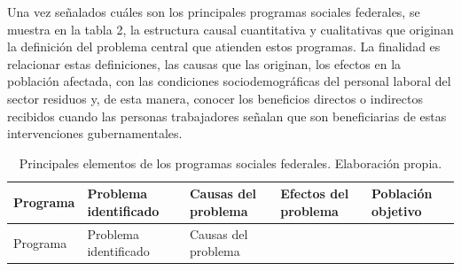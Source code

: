 \documentclass[
  spanish,
  11.5pt,
  170mm x 240mmpaper,
]{scrbook}
\begin{document}
Una vez señalados cuáles son los principales programas sociales
federales, se muestra en la tabla 2, la estructura causal cuantitativa y
cualitativas que originan la definición del problema central que
atienden estos programas. La finalidad es relacionar estas definiciones,
las causas que las originan, los efectos en la población afectada, con
las condiciones sociodemográficas del personal laboral del sector
residuos y, de esta manera, conocer los beneficios directos o indirectos
recibidos cuando las personas trabajadores señalan que son beneficiarias
de estas intervenciones gubernamentales.

\begingroup
\scriptsize

\begin{longtable}[]{@{}
  >{\raggedright\arraybackslash}p{}
  >{\raggedright\arraybackslash}p{}
  >{\raggedright\arraybackslash}p{}
  >{\raggedright\arraybackslash}p{}
  >{\raggedright\arraybackslash}p{}@{}}
\caption{Principales elementos de los programas sociales federales.
Elaboración propia.}\label{tbl-2}\tabularnewline
\toprule\noalign{}
\begin{minipage}[b]{\linewidth}\raggedright
Programa
\end{minipage} & \begin{minipage}[b]{\linewidth}\raggedright
Problema identificado
\end{minipage} & \begin{minipage}[b]{\linewidth}\raggedright
Causas del problema
\end{minipage} & \begin{minipage}[b]{\linewidth}\raggedright
Efectos del problema
\end{minipage} & \begin{minipage}[b]{\linewidth}\raggedright
Población objetivo
\end{minipage} \\
\midrule\noalign{}
\endfirsthead
\toprule\noalign{}
\begin{minipage}[b]{\linewidth}\raggedright
Programa
\end{minipage} & \begin{minipage}[b]{\linewidth}\raggedright
Problema identificado
\end{minipage} & \begin{minipage}[b]{\linewidth}\raggedright
Causas del problema

\end{minipage}
\end{longtable}
\end{document}
